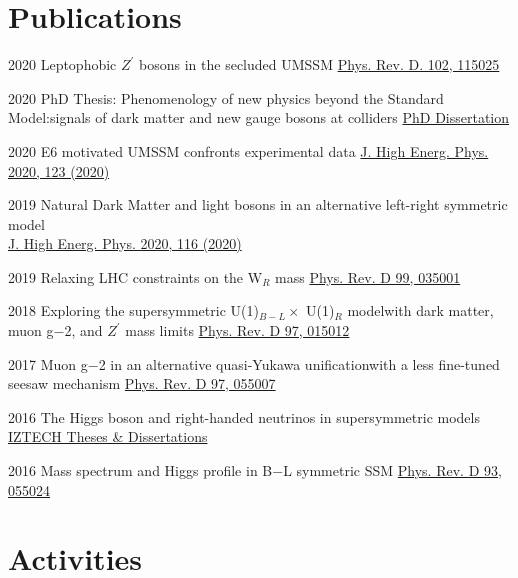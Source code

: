 \documentclass[]{friggeri-cv}
\begin{document}
\section{Publications}
\begin{entrylist}
	\entryp
	{2020}
	{Leptophobic $Z^\prime$ bosons in the secluded UMSSM}
	{\href{https://link.aps.org/doi/10.1103/PhysRevD.102.115025}{Phys. Rev. D. 102, 115025}} 
	
	\entryLongTitle
    {2020}
    {PhD Thesis: Phenomenology of new physics beyond the Standard Model:}{signals of dark matter and new gauge bosons at colliders}
    {\href{https://spectrum.library.concordia.ca/987328/}{PhD Dissertation}} 	
	
	\entryp
	{2020}
	{E6 motivated UMSSM confronts experimental data}
	{\href{https://doi.org/10.1007/JHEP05(2020)123}{J. High Energ. Phys. 2020, 123 (2020)}} 	
	
	\entryp
	{2019}
	{Natural Dark Matter and light bosons in an alternative left-right symmetric model \\}
	{\href{https://doi.org/10.1007/JHEP04(2020)116}{J. High Energ. Phys. 2020, 116 (2020)}} 
	
	\entryp
	{2019}
	{Relaxing LHC constraints on the W$_R$ mass}
	{\href{https://journals.aps.org/prd/abstract/10.1103/PhysRevD.99.035001}{Phys. Rev. D 99, 035001}} 
	
	\entryLongTitle
	{2018}
	{Exploring the supersymmetric U(1)$_{B-L} \times$ U(1)$_R$ model}{with dark matter, muon g−2, and $Z^\prime$ mass limits}
	{\href{https://journals.aps.org/prd/abstract/10.1103/PhysRevD.97.015012}{Phys. Rev. D 97, 015012}} 
	
	\entryLongTitle
	{2017}
	{Muon g−2 in an alternative quasi-Yukawa unification}{with a less fine-tuned seesaw mechanism}
	{\href{http://journals.aps.org/prd/abstract/10.1103/PhysRevD.97.055007}{Phys. Rev. D 97, 055007}} 
	
	\entryp
	{2016}
	{The Higgs boson and right-handed neutrinos in supersymmetric models \\}
	{\href{http://openaccess.iyte.edu.tr/xmlui/handle/11147/2842}{IZTECH Theses \& Dissertations}} 
	
	\entryp
	{2016}
	{Mass spectrum and Higgs profile in B−L symmetric SSM}
	{\href{http://journals.aps.org/prd/abstract/10.1103/PhysRevD.93.055024}{Phys. Rev. D 93, 055024}} 
	
\end{entrylist}

\section{Activities}
\end{document}
